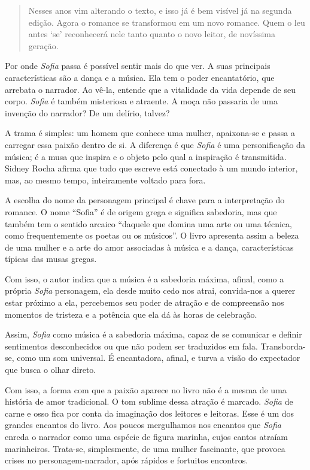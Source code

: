 \documentclass[12pt]{extarticle}
\begin{document}
\begin{quote}

Nesses anos vim alterando o texto, 
e isso já é bem visível já na segunda edição. Agora o romance 
se transformou em um novo romance. Quem o leu antes ‘se’ reconhecerá 
nele tanto quanto o novo leitor, de novíssima geração.

\end{quote}

Por onde \textit{Sofia} passa é possível sentir mais do que ver. 
A suas principais características são a dança e a música. 
Ela tem o poder encantatório, que arrebata o narrador. Ao vê-la,
entende que a vitalidade da vida depende de seu corpo. 
\textit{Sofia} é também misteriosa e atraente. A moça 
não passaria de uma invenção do narrador? De um delírio, talvez?  

A trama é simples: um homem que conhece uma mulher, apaixona-se e passa a
carregar essa paixão dentro de si. A diferença é que \textit{Sofia} é uma personificação
da música; é a musa que inspira e o objeto pelo qual a inspiração é
transmitida. Sidney Rocha afirma que tudo que escreve está conectado à um mundo interior, mas, ao mesmo tempo, inteiramente 
voltado para fora.

A escolha do nome da personagem principal é chave para a interpretação 
do romance. O nome ``Sofia'' é de origem grega e significa sabedoria, 
mas que também tem o sentido arcaico ``daquele que domina uma arte 
ou uma técnica, como frequentemente os poetas ou os músicos''. 
O livro apresenta assim a beleza de uma mulher e a arte do amor
associadas à música e a dança, características típicas das 
musas gregas.

Com isso, o autor indica que
a música é a sabedoria máxima, afinal, como a própria \textit{Sofia} personagem, ela
desde muito cedo nos atrai, convida-nos a querer estar próximo a ela,
percebemos seu poder de atração e de compreensão nos momentos de tristeza e a
potência que ela dá às horas de celebração.  

Assim, \textit{Sofia} como música é a
sabedoria máxima, capaz de se comunicar e definir sentimentos
desconhecidos ou que não podem ser traduzidos em fala. Transborda-se, como 
um som universal. É encantadora, afinal, e turva a visão do expectador que 
busca o olhar direto.  

Com isso, a forma com que a paixão aparece no livro não é a mesma
de uma história de amor tradicional. O tom sublime dessa atração é 
marcado.  \textit{Sofia} de carne e osso fica por conta da imaginação
dos leitores e leitoras. Esse é um dos grandes encantos do livro. Aos poucos
mergulhamos nos encantos que \textit{Sofia} enreda o narrador como uma espécie 
de figura marinha, cujos cantos atraíam marinheiros.
Trata-se, simplesmente, de uma mulher fascinante, que provoca crises no
personagem-narrador, após rápidos e fortuitos encontros.  
\end{document}
